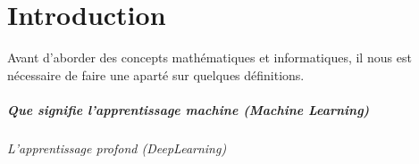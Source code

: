 \chapter{Introduction}
Avant d'aborder des concepts math\'ematiques et informatiques, il nous est n\'ecessaire de faire une apart\'e sur quelques d\'efinitions.

\paragraph{Que signifie l'apprentissage machine (Machine Learning)}

\subparagraph{L'apprentissage profond (DeepLearning)}